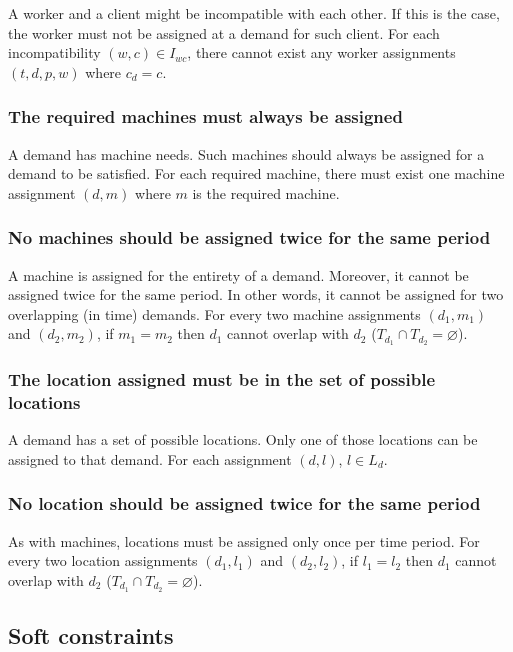 \documentclass[../thesis.tex]{subfiles}
\begin{document}
A worker and a client might be incompatible with each other. 
If this is the case, the worker must not be assigned at a demand for such client.
For each incompatibility $(w, c) \in I_{wc}$, there cannot exist any worker assignments $(t, d, p, w)$ where 
$c_d = c$.

\subsubsection{The required machines must always be assigned}

A demand has machine needs. Such machines should always be assigned 
for a demand to be satisfied.
For each required machine, there must exist one machine assignment $(d, m)$ where $m$ is the required machine.


\subsubsection{No machines should be assigned twice for the same period}

A machine is assigned for the entirety of a demand. Moreover, it cannot be assigned twice 
for the same period. In other words, it cannot be assigned for two overlapping (in time) demands.
For every two machine assignments $(d_1, m_1)$ and $(d_2, m_2)$, if $m_1 = m_2$ then $d_1$ cannot overlap with $d_2$
($T_{d_1} \cap T_{d_2} = \varnothing $).


\subsubsection{The location assigned must be in the set of possible locations}

A demand has a set of possible locations. Only one of those locations can be assigned 
to that demand.
For each assignment $(d, l)$, $l \in L_d$.

\subsubsection{No location should be assigned twice for the same period}

As with machines, locations must be assigned only once per time period.
For every two location assignments $(d_1, l_1)$ and $(d_2, l_2)$, if $l_1 = l_2$ then $d_1$ cannot overlap with $d_2$
($T_{d_1} \cap T_{d_2} = \varnothing $).


\subsection{Soft constraints}
\end{document}
